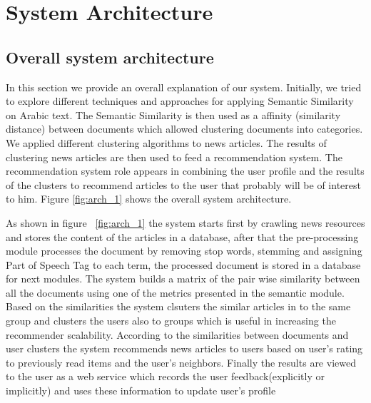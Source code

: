 
\chapter{System Architecture} %

\label{sysArch} %


\section{Overall system architecture}
In this section we provide an overall explanation of our system.  Initially, we tried to explore different techniques and approaches for applying Semantic Similarity on Arabic text. The Semantic Similarity is then used as a affinity (similarity distance) between documents which allowed clustering documents into categories. We applied different clustering algorithms to news articles. The results of clustering news articles are then used to feed a recommendation system. The recommendation system role appears in combining the user profile and the results of the clusters to recommend articles to the user that probably will be of interest to him. Figure \ref{fig:arch_1} shows the overall system architecture.

As shown in figure ~\ref{fig:arch_1} the system starts first by crawling news resources and stores the content of the articles in a database, after that the pre-processing module processes the document by removing stop words, stemming and assigning Part of Speech Tag to each term, the processed document is stored in a database for next modules. The system builds a matrix of the pair wise similarity between all the documents using one of the  metrics presented in the semantic module. Based on the similarities the system clsuters the similar articles in to the same group and clusters the users also to groups which is useful in increasing the recommender scalability. According to the similarities between documents and user clusters the system recommends news articles to users based on user's rating to previously read items and the user's neighbors. Finally the results are viewed to the user as a web service which records the user feedback(explicitly or implicitly) and uses these information to update user's profile


